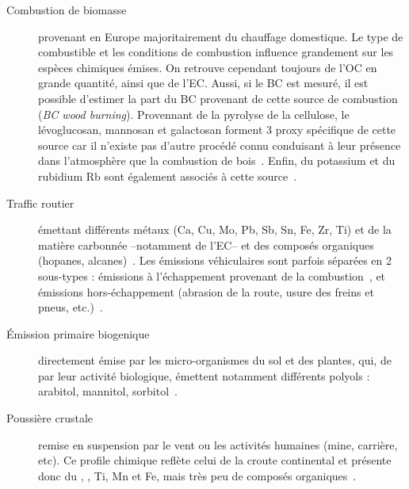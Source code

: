 \begin{description}
    \item[Combustion de biomasse] provenant en Europe majoritairement du chauffage
        domestique. Le type de combustible et les conditions de combustion influence
        grandement sur les espèces chimiques émises. On retrouve cependant toujours de
        l'OC en grande quantité, ainsi que de l'EC. Aussi, si le BC est mesuré, il est
        possible d'estimer la part du BC provenant de cette source de combustion \BCwb{}
        (\textit{BC wood burning}).
        Provennant de la pyrolyse de la cellulose, le lévoglucosan, mannosan et
        galactosan forment 3 proxy spécifique de cette source car il n'existe pas d'autre
        procédé connu conduisant à leur présence dans l'atmosphère que la combustion de
        bois~\autocite{jordanLevoglucosan2006,puxbaumLevoglucosan2007}.
        Enfin, du potassium  et du rubidium Rb sont également associés à cette
        source~\autocite{navaBiomass2015,gollyEtude2014,chevrierChauffage2016}.

    \item[Traffic routier] émettant différents métaux (Ca, Cu, Mo, Pb, Sb, Sn, Fe, Zr,
        Ti) et de la matière carbonnée --notamment de l'EC-- et des composés organiques
        (hopanes, alcanes)~\autocite{schauerCharacterization2006,charronIdentification2019}. Les émissions
        véhiculaires sont parfois séparées en 2 sous-types : émissions à l'échappement
        provenant de la combustion~\autocite{allenSize2001,huMetals2009,vianaSource2008},
        et émissions hors-échappement (abrasion de la route, usure des freins et pneus,
        etc.)~\autocite{grigoratosBrake2015,sandersAirborne2003,sternbeckMetal2002}.

    \item[Émission primaire biogenique] directement émise par les micro-organismes du sol
        et des plantes, qui, de par leur activité biologique, émettent notamment
        différents polyols : arabitol, mannitol,
        sorbitol~\autocite{bauerSignificant2008,yttriAmbient2007,samakePolyols2019}.

    \item[Poussière crustale] remise en suspension par le vent ou les activités humaines
        (mine, carrière, etc). Ce profile chimique reflète celui de la croute continental
        et présente donc du , , Ti, Mn et Fe, mais très peu de composés
        organiques~\autocite{almeidaSource2005,dallostoHourly2013,morenoVariations2011,putaudSizesegregated2004}.


\end{description}

